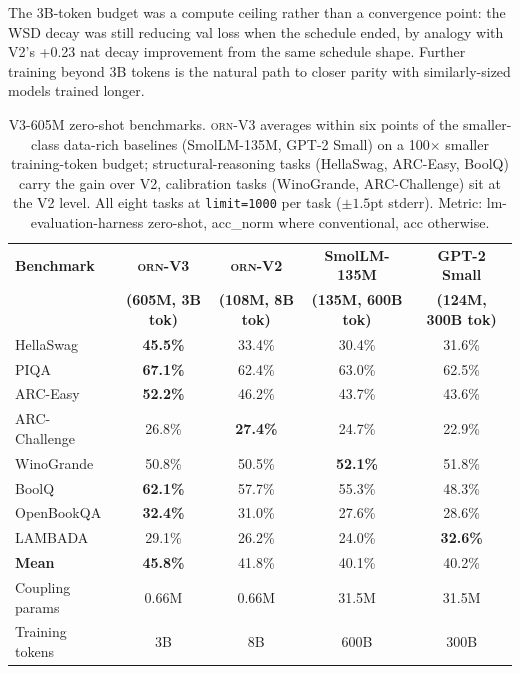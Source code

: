 \documentclass[10pt,twocolumn]{article}
\newcommand{\orn}{\textsc{orn}}
\begin{document}
The 3B-token budget was a compute ceiling rather than a convergence point: the WSD decay was still reducing val loss when the schedule ended, by analogy with V2's +0.23 nat decay improvement from the same schedule shape. Further training beyond 3B tokens is the natural path to closer parity with similarly-sized models trained longer.

\begin{table}[t]
\centering\footnotesize
\begin{tabular}{@{}lcccc@{}}
\toprule
\textbf{Benchmark} & \textbf{\orn{}-V3} & \textbf{\orn{}-V2} & \textbf{SmolLM-135M} & \textbf{GPT-2 Small} \\
& \textbf{(605M, 3B tok)} & \textbf{(108M, 8B tok)} & \textbf{(135M, 600B tok)} & \textbf{(124M, 300B tok)} \\
\midrule
HellaSwag     & \textbf{45.5\%} & 33.4\% & 30.4\% & 31.6\% \\
PIQA          & \textbf{67.1\%} & 62.4\% & 63.0\% & 62.5\% \\
ARC-Easy      & \textbf{52.2\%} & 46.2\% & 43.7\% & 43.6\% \\
ARC-Challenge & 26.8\%          & \textbf{27.4\%} & 24.7\% & 22.9\% \\
WinoGrande    & 50.8\%          & 50.5\%          & \textbf{52.1\%} & 51.8\% \\
BoolQ         & \textbf{62.1\%} & 57.7\%          & 55.3\% & 48.3\% \\
OpenBookQA           & \textbf{32.4\%} & 31.0\% & 27.6\% & 28.6\% \\
LAMBADA              & 29.1\%          & 26.2\% & 24.0\% & \textbf{32.6\%} \\
\midrule
\textbf{Mean}        & \textbf{45.8\%} & 41.8\% & 40.1\% & 40.2\% \\
Coupling params      & 0.66M           & 0.66M  & 31.5M  & 31.5M \\
Training tokens      & 3B              & 8B     & 600B   & 300B  \\
\bottomrule
\end{tabular}
\caption{V3-605M zero-shot benchmarks. \orn{}-V3 averages within six points of the smaller-class data-rich baselines (SmolLM-135M, GPT-2 Small) on a 100$\times$ smaller training-token budget; structural-reasoning tasks (HellaSwag, ARC-Easy, BoolQ) carry the gain over V2, calibration tasks (WinoGrande, ARC-Challenge) sit at the V2 level. All eight tasks at \texttt{limit=1000} per task ($\pm 1.5$pt stderr). Metric: lm-evaluation-harness zero-shot, acc\_norm where conventional, acc otherwise.}
\label{tab:v3_benchmarks}
\end{table}
\end{document}
